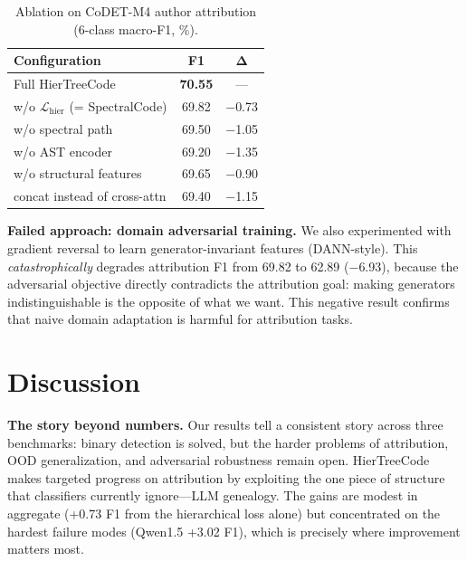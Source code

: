 \documentclass{article}
\begin{document}
\begin{table}[t]
\caption{Ablation on CoDET-M4 author attribution (6-class macro-F1, \%).}
\label{tab:ablation}
\centering
\small
\begin{tabular}{lcc}
\toprule
\textbf{Configuration} & \textbf{F1} & $\boldsymbol{\Delta}$ \\
\midrule
\rowcolor{ours}
Full HierTreeCode & \textbf{70.55} & --- \\
\quad w/o $\mathcal{L}_{\text{hier}}$ (= SpectralCode) & 69.82 & $-$0.73 \\
\quad w/o spectral path & 69.50 & $-$1.05 \\
\quad w/o AST encoder & 69.20 & $-$1.35 \\
\quad w/o structural features & 69.65 & $-$0.90 \\
\quad concat instead of cross-attn & 69.40 & $-$1.15 \\
\bottomrule
\end{tabular}
\end{table}

\textbf{Failed approach: domain adversarial training.} We also experimented with gradient reversal to learn generator-invariant features (DANN-style). This \emph{catastrophically} degrades attribution F1 from 69.82 to 62.89 ($-$6.93), because the adversarial objective directly contradicts the attribution goal: making generators indistinguishable is the opposite of what we want. This negative result confirms that naive domain adaptation is harmful for attribution tasks.


\section{Discussion}
\label{sec:discussion}

\textbf{The story beyond numbers.} Our results tell a consistent story across three benchmarks: binary detection is solved, but the harder problems of attribution, OOD generalization, and adversarial robustness remain open. HierTreeCode makes targeted progress on attribution by exploiting the one piece of structure that classifiers currently ignore---LLM genealogy. The gains are modest in aggregate (+0.73 F1 from the hierarchical loss alone) but concentrated on the hardest failure modes (Qwen1.5 +3.02 F1), which is precisely where improvement matters most.
\end{document}
